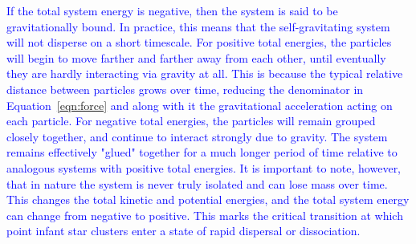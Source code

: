 \documentclass[main.tex]{subfiles}
\begin{document}
\begin{tcolorbox}[sharp corners, colback=blue!30, colframe=blue!80!blue, title=Gravitational Binding Energy$^9$]
\par \textcolor{blue} {If the total system energy is negative, then the system is said to be gravitationally bound.  In practice, this means that the self-gravitating system will not disperse on a short timescale.  For positive total energies, the particles will begin to move farther and farther away from each other, until eventually they are hardly interacting via gravity at all.  This is because the typical relative distance between particles grows over time, reducing the denominator in Equation~\ref{eqn:force} and along with it the gravitational acceleration acting on each particle.  For negative total energies, the particles will remain grouped closely together, and continue to interact strongly due to gravity.  The system remains effectively "glued" together for a much longer period of time relative to analogous systems with positive total energies.  It is important to note, however, that in nature the system is never truly isolated and can lose mass over time.  This changes the total kinetic and potential energies, and the total system energy can change from negative to positive.  This marks the critical transition at which point infant star clusters enter a state of rapid dispersal or dissociation.}
\end{tcolorbox}
\end{document}
